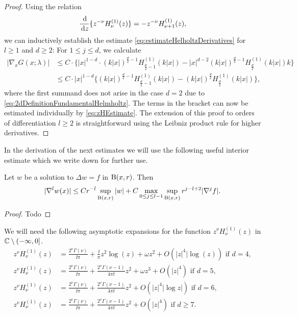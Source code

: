 \begin{proof}
  Using the relation
  \begin{align*}
    \frac{\, {\operatorname{d}\!{}}}{\, {\operatorname{d}\!{z}}} \{ z^{-\nu} H_\nu^{(1)}(z) \} = -z^{-\nu} H_{\nu + 1}^{(1)} (z),
  \end{align*}
  we can inductively establish the estimate \eqref{eq:estimateHelholtzDerivatives} for $l \geq 1$ and $d \geq 2$:
  For $1 \leq j \leq d$, we calculate
  \begin{align*}
    |\nabla_x^{} G(x; \lambda)|
    &\leq C  \cdot \big\{|x|^{1 - d} \cdot (k|x|)^{\frac{d}{2} - 1} H_{\frac{d}{2} - 1}^{(1)}(k|x|) - |x|^{d - 2} (k|x|)^{\frac{d}{2} - 1} H_{\frac{d}{2}}^{(1)}(k|x|) k\big\} \\
    &\leq C \cdot |x|^{1 - d}\big\{(k|x|)^{\frac{d}{2} - 1} H_{\frac{d}{2} - 1}^{(1)}(k|x|) -  (k|x|)^{\frac{d}{2}} H_{\frac{d}{2}}^{(1)}(k|x|) \big\},
  \end{align*}
  where the first summand does not arise in the case $d = 2$ due to \eqref{eq:2dDefinitionFundamentalHelmholtz}.
  The terms in the bracket can now be estimated individually by \eqref{eq:zHEstimate}.
  The extension of this proof to orders of differentiation $l \geq 2$ is straightforward using the Leibniz product rule for higher derivatives.
\end{proof}

In the derivation of the next estimates we will use the following useful interior estimate which we write down for further use.

\begin{lem}
  \label{lem:interiorEstimatePoisson}
  Let $w$ be a solution to $\Delta w = f$ in $\mathrm{B}(x,r)$. Then
  \begin{align}
    \label{eq:interiorEstimatePoisson}
    |\nabla^l w(x)| \leq C r^{-l} \sup_{\mathrm{B}(x,r)} |w| + C \max_{0 \leq j \leq l - 1} \sup_{\mathrm{B}(x,r)} r^{j - l + 2} |\nabla^j f|.
  \end{align}
\end{lem}

\begin{proof}
  Todo
\end{proof}

We will need the following asymptotic expansions for the function $z^\nu H_\nu^{(1)}(z)$ in $\mathbb{C} \setminus (-\infty, 0]$.
\begin{align}
  z^{\nu}H_\nu^{(1)}(z) &= \frac{2^\nu \Gamma(\nu)}{\ii \pi} + \frac{\ii}{\pi} z^2 \log(z) + \omega z^2 + O(|z|^4 |\log(z)) \text{ if } d = 4, \label{eq:asymptoticd4}\\
  z^{\nu} H_{\nu}^{(1)}(z) &= \frac{2^\nu \Gamma(\nu)}{\ii\pi} + \frac{2^\nu \Gamma(\nu - 1)}{4 \pi \ii} z^2 + \omega z^3 + O(|z|^4) \text{ if } d = 5, \label{eq:asymptoticd5}\\
  z^\nu H_\nu^{(1)}(z) &= \frac{2^\nu \Gamma(\nu)}{\ii \pi} + \frac{2^\nu \Gamma(\nu - 1)}{4\pi \ii}z^2 + O(|z|^4 |\log z|) \text{ if } d = 6,\label{eq:asymptoticd6} \\
  z^\nu H_\nu^{(1)}(z) &= \frac{2^\nu \Gamma(\nu)}{\ii \pi} + \frac{2^\nu \Gamma(\nu - 1)}{4 \pi \ii} z^2 + O(|z|^4) \text{ if } d \geq 7.\label{eq:asymptoticd7}
\end{align}

